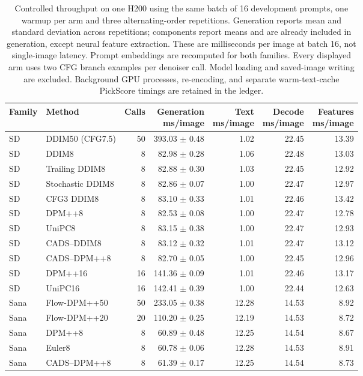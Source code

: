 \begin{table}[t]
\centering\footnotesize
\begin{tabular}{llrrrrr}
\toprule
Family & Method & Calls & \shortstack{Generation\\ms/image} & \shortstack{Text\\ms/image} & \shortstack{Decode\\ms/image} & \shortstack{Features\\ms/image} \\
\midrule
SD & DDIM50 (CFG7.5) & 50 & 393.03 $\pm$ 0.48 & 1.02 & 22.45 & 13.39 \\
SD & DDIM8 & 8 & 82.98 $\pm$ 0.28 & 1.06 & 22.48 & 13.03 \\
SD & Trailing DDIM8 & 8 & 82.88 $\pm$ 0.30 & 1.03 & 22.45 & 12.92 \\
SD & Stochastic DDIM8 & 8 & 82.86 $\pm$ 0.07 & 1.00 & 22.47 & 12.97 \\
SD & CFG3 DDIM8 & 8 & 83.10 $\pm$ 0.33 & 1.01 & 22.46 & 13.42 \\
SD & DPM++8 & 8 & 82.53 $\pm$ 0.08 & 1.00 & 22.47 & 12.78 \\
SD & UniPC8 & 8 & 83.15 $\pm$ 0.38 & 1.00 & 22.47 & 12.93 \\
SD & CADS--DDIM8 & 8 & 83.12 $\pm$ 0.32 & 1.01 & 22.47 & 13.12 \\
SD & CADS--DPM++8 & 8 & 82.70 $\pm$ 0.05 & 1.00 & 22.45 & 12.96 \\
SD & DPM++16 & 16 & 141.36 $\pm$ 0.09 & 1.01 & 22.46 & 13.17 \\
SD & UniPC16 & 16 & 142.41 $\pm$ 0.39 & 1.00 & 22.44 & 12.63 \\
Sana & Flow-DPM++50 & 50 & 233.05 $\pm$ 0.38 & 12.28 & 14.53 & 8.92 \\
Sana & Flow-DPM++20 & 20 & 110.20 $\pm$ 0.25 & 12.19 & 14.53 & 8.72 \\
Sana & DPM++8 & 8 & 60.89 $\pm$ 0.48 & 12.25 & 14.54 & 8.67 \\
Sana & Euler8 & 8 & 60.78 $\pm$ 0.06 & 12.28 & 14.53 & 8.91 \\
Sana & CADS--DPM++8 & 8 & 61.39 $\pm$ 0.17 & 12.25 & 14.54 & 8.73 \\
\bottomrule
\end{tabular}
\caption{Controlled throughput on one H200 using the same batch of 16 development prompts, one warmup per arm and three alternating-order repetitions. Generation reports mean and standard deviation across repetitions; components report means and are already included in generation, except neural feature extraction. These are milliseconds per image at batch 16, not single-image latency. Prompt embeddings are recomputed for both families. Every displayed arm uses two CFG branch examples per denoiser call. Model loading and saved-image writing are excluded. Background GPU processes, re-encoding, and separate warm-text-cache PickScore timings are retained in the ledger.}
\label{tab:t2i_controlled_timing}
\end{table}
